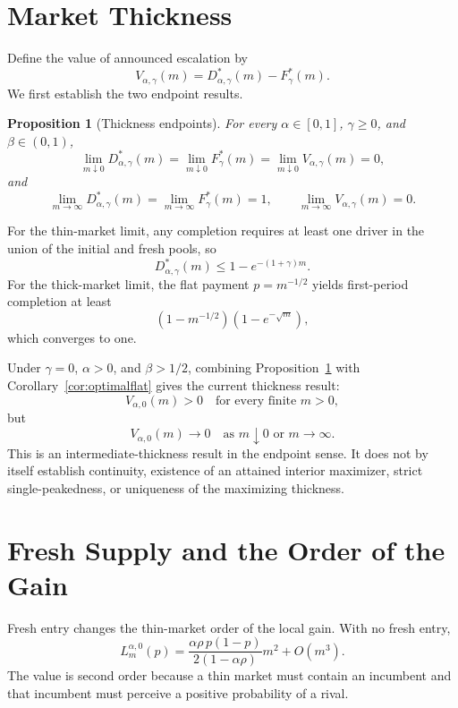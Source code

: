 \documentclass[11pt]{article}
\newtheorem{proposition}{Proposition}
\theoremstyle{definition}
\theoremstyle{remark}
\begin{document}
\section{Market Thickness}
\label{sec:thickness}

Define the value of announced escalation by
\[
  V_{\alpha,\gamma}(m)
  =
  D_{\alpha,\gamma}^*(m)-F_\gamma^*(m).
\]
We first establish the two endpoint results.

\begin{proposition}[Thickness endpoints]
\label{prop:endpoints}
For every \(\alpha\in[0,1]\), \(\gamma\ge0\), and \(\beta\in(0,1)\),
\[
  \lim_{m\downarrow0}
  D_{\alpha,\gamma}^*(m)
  =
  \lim_{m\downarrow0}
  F_\gamma^*(m)
  =
  \lim_{m\downarrow0}
  V_{\alpha,\gamma}(m)
  =0,
\]
and
\[
  \lim_{m\to\infty}
  D_{\alpha,\gamma}^*(m)
  =
  \lim_{m\to\infty}
  F_\gamma^*(m)
  =1,
\qquad
  \lim_{m\to\infty}V_{\alpha,\gamma}(m)=0.
\]
\end{proposition}

For the thin-market limit, any completion requires at least one driver in the
union of the initial and fresh pools, so
\[
  D_{\alpha,\gamma}^*(m)
  \le1-e^{-(1+\gamma)m}.
\]
For the thick-market limit, the flat payment \(p=m^{-1/2}\) yields first-period
completion at least
\[
  (1-m^{-1/2})(1-e^{-\sqrt m}),
\]
which converges to one.

Under \(\gamma=0\), \(\alpha>0\), and \(\beta>1/2\), combining
Proposition~\ref{prop:endpoints} with Corollary~\ref{cor:optimalflat} gives the
current thickness result:
\[
  V_{\alpha,0}(m)>0
  \quad\text{for every finite }m>0,
\]
but
\[
  V_{\alpha,0}(m)\to0
  \quad\text{as }m\downarrow0
  \text{ or }m\to\infty.
\]
This is an intermediate-thickness result in the endpoint sense.  It does not
by itself establish continuity, existence of an attained interior maximizer,
strict single-peakedness, or uniqueness of the maximizing thickness.

\section{Fresh Supply and the Order of the Gain}
\label{sec:fresh}

Fresh entry changes the thin-market order of the local gain.  With no fresh
entry,
\[
  L_m^{\alpha,0}(p)
  =
  \frac{\alpha\rho\,p(1-p)}
       {2(1-\alpha\rho)}m^2
  +O(m^3).
\]
The value is second order because a thin market must contain an incumbent and
that incumbent must perceive a positive probability of a rival.
\end{document}

